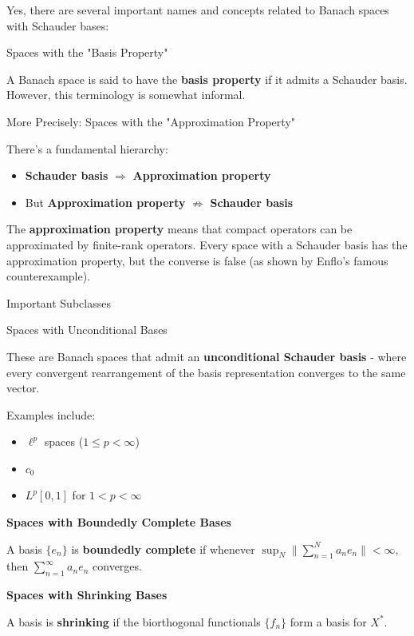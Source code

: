 \documentclass[aps,preprint]{revtex4}
\newenvironment{answer}
  {\begin{tcolorbox}[colback=green!5!white,colframe=green!75!black,title=Answer]}
  {\end{tcolorbox}}
\begin{document}
\begin{answer}
Yes, there are several important names and concepts related to Banach spaces
with Schauder bases:

Spaces with the "Basis Property"

A Banach space is said to have the \textbf{basis property} if it admits a
Schauder basis. However, this terminology is somewhat informal.

More Precisely: Spaces with the "Approximation Property"

There's a fundamental hierarchy:

\begin{itemize}
\item \textbf{Schauder basis} $\Rightarrow $ \textbf{Approximation property %
\label{10/31/2025}}

\item But \textbf{Approximation property} $\nRightarrow$ \textbf{Schauder
basis}
\end{itemize}

The \textbf{approximation property} means that compact operators can be
approximated by finite-rank operators. Every space with a Schauder basis has
the approximation property, but the converse is false (as shown by Enflo's
famous counterexample).

Important Subclasses

Spaces with Unconditional Bases

These are Banach spaces that admit an \textbf{unconditional Schauder basis}
- where every convergent rearrangement of the basis representation converges
to the same vector.

Examples include:

\begin{itemize}
\item $\ell^p$ spaces ($1 \leq p < \infty$)

\item $c_0$

\item $L^p[0,1]$ for $1 < p < \infty$
\end{itemize}

\textbf{Spaces with Boundedly Complete Bases}

A basis $\{e_n\}$ is \textbf{boundedly complete} if whenever $\sup_N
\|\sum_{n=1}^N a_n e_n\| < \infty$, then $\sum_{n=1}^\infty a_n e_n$
converges.

\textbf{Spaces with Shrinking Bases}

A basis is \textbf{shrinking} if the biorthogonal functionals $\{f_n\}$ form
a basis for $X^*$.


\end{answer}
\end{document}
